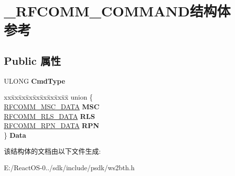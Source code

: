 \hypertarget{struct___r_f_c_o_m_m___c_o_m_m_a_n_d}{}\section{\+\_\+\+R\+F\+C\+O\+M\+M\+\_\+\+C\+O\+M\+M\+A\+N\+D结构体 参考}
\label{struct___r_f_c_o_m_m___c_o_m_m_a_n_d}
\subsection*{Public 属性}
\begin{DoxyCompactItemize}
\item 
\mbox{\label{struct___r_f_c_o_m_m___c_o_m_m_a_n_d_a0e5128cf1abc158a2b72b1800e9f7f47}} 
U\+L\+O\+NG {\bfseries Cmd\+Type}
\item 
\mbox{\label{struct___r_f_c_o_m_m___c_o_m_m_a_n_d_a35535ada31b8d22172ef88d1b34797cd}} 
\begin{tabbing}
xx\=xx\=xx\=xx\=xx\=xx\=xx\=xx\=xx\=\kill
union \{\\
\>\hyperlink{struct___r_f_c_o_m_m___m_s_c___d_a_t_a}{RFCOMM\_MSC\_DATA} {\bfseries MSC}\\
\>\hyperlink{struct___r_f_c_o_m_m___r_l_s___d_a_t_a}{RFCOMM\_RLS\_DATA} {\bfseries RLS}\\
\>\hyperlink{struct___r_f_c_o_m_m___r_p_n___d_a_t_a}{RFCOMM\_RPN\_DATA} {\bfseries RPN}\\
\} {\bfseries Data}\\

\end{tabbing}\end{DoxyCompactItemize}


该结构体的文档由以下文件生成\+:\begin{DoxyCompactItemize}
\item 
E\+:/\+React\+O\+S-\/0../sdk/include/psdk/ws2bth.\+h\end{DoxyCompactItemize}
